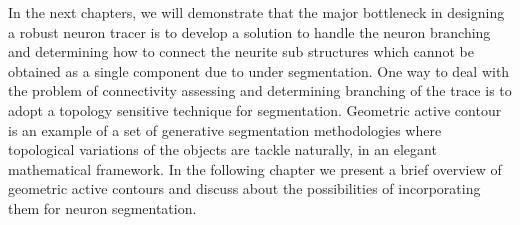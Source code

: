 In the next chapters, we will demonstrate that the major bottleneck in designing a robust neuron tracer is to develop a solution to handle the neuron branching and determining how to connect the neurite sub structures which cannot be obtained as a single component due to under segmentation. One way to deal with the problem of connectivity assessing and determining branching of the trace is to adopt a topology sensitive technique for segmentation. Geometric active contour is an example of a set of generative segmentation methodologies where topological variations of the objects are tackle naturally, in an elegant mathematical framework. In the following chapter we present a brief overview of geometric active contours and discuss about the possibilities of incorporating them for neuron segmentation.